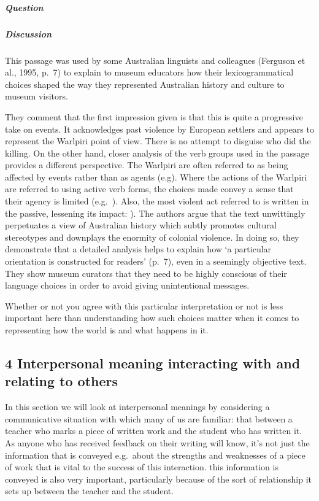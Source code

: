 \documentclass[letterpaper,10pt,english]{sphinxmanual}
\begin{document}
\subparagraph{Question}
\label{\detokenize{content/session_00/Part_00_03:question-1}}\label{\detokenize{content/session_00/Part_00_03:id2}}

\subparagraph{Discussion}
\label{\detokenize{content/session_00/Part_00_03:Discussion}}
This passage was used by some Australian linguists and colleagues (Ferguson et al., 1995, p. 7) to explain to museum educators how their lexicogrammatical choices shaped the way they represented Australian history and culture to museum visitors.

They comment that the first impression given is that this is quite a progressive take on events. It acknowledges past violence by European settlers and appears to represent the Warlpiri point of view. There is no attempt to disguise who did the killing. On the other hand, closer analysis of the verb groups used in the passage provides a different perspective. The Warlpiri are often referred to as being affected by events rather than as agents (e.g). Where the actions of the Warlpiri are referred to using active verb forms, the choices made convey a sense that their agency is limited (e.g. ). Also, the most violent act referred to is written in the passive, lessening its impact: ). The authors argue that the text unwittingly perpetuates a view of Australian history which subtly promotes cultural stereotypes and downplays the enormity of
colonial violence. In doing so, they demonstrate that a detailed analysis helps to explain how ‘a particular orientation is constructed for readers’ (p. 7), even in a seemingly objective text. They show museum curators that they need to be highly conscious of their language choices in order to avoid giving unintentional messages.

Whether or not you agree with this particular interpretation or not is less important here than understanding how such choices matter when it comes to representing how the world is and what happens in it.


\subsection{4 Interpersonal meaning \textendash{} interacting with and relating to others}
\label{\detokenize{content/session_00/Part_00_04:4-Interpersonal-meaning-_-interacting-with-and-relating-to-others}}\label{\detokenize{content/session_00/Part_00_04::doc}}
In this section we will look at interpersonal meanings by considering a communicative situation with which many of us are familiar: that between a teacher who marks a piece of written work and the student who has written it. As anyone who has received feedback on their writing will know, it’s not just the information that is conveyed \textendash{} e.g. about the strengths and weaknesses of a piece of work \textendash{} that is vital to the success of this interaction.  this information is conveyed is also very
important, particularly because of the sort of relationship it sets up between the teacher and the student.
\end{document}
